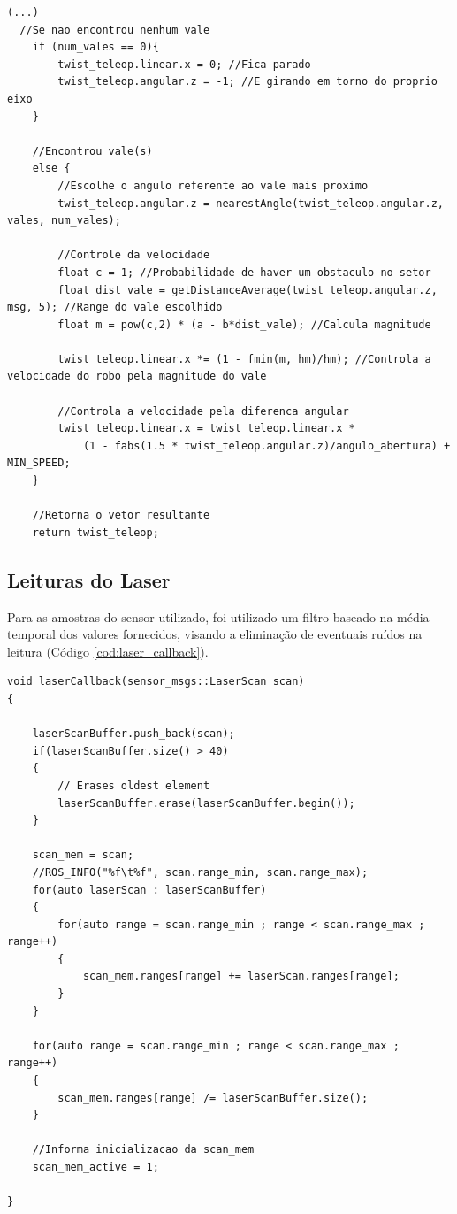 \begin{lstlisting}[frame=single, label=cod:vales, style=customc, caption={Escolha da direção e velocidade}]
(...)
  //Se nao encontrou nenhum vale
    if (num_vales == 0){
        twist_teleop.linear.x = 0; //Fica parado
        twist_teleop.angular.z = -1; //E girando em torno do proprio eixo
    }
    
    //Encontrou vale(s)
    else {
        //Escolhe o angulo referente ao vale mais proximo
        twist_teleop.angular.z = nearestAngle(twist_teleop.angular.z, vales, num_vales);
        
        //Controle da velocidade
        float c = 1; //Probabilidade de haver um obstaculo no setor
        float dist_vale = getDistanceAverage(twist_teleop.angular.z, msg, 5); //Range do vale escolhido
        float m = pow(c,2) * (a - b*dist_vale); //Calcula magnitude
        
        twist_teleop.linear.x *= (1 - fmin(m, hm)/hm); //Controla a velocidade do robo pela magnitude do vale
        
        //Controla a velocidade pela diferenca angular
        twist_teleop.linear.x = twist_teleop.linear.x *
            (1 - fabs(1.5 * twist_teleop.angular.z)/angulo_abertura) + MIN_SPEED;
    }
    
    //Retorna o vetor resultante
    return twist_teleop;

\end{lstlisting}

\subsection{Leituras do Laser}

Para as amostras do sensor utilizado, foi utilizado um filtro baseado
na média temporal dos valores fornecidos, visando a eliminação de
eventuais ruídos na leitura (Código \ref{cod:laser_callback}).

\begin{lstlisting}[frame=single, label=cod:laser_callback, style=customc, caption={Filtro de amostras do laser}]
void laserCallback(sensor_msgs::LaserScan scan)
{
    
    laserScanBuffer.push_back(scan);
    if(laserScanBuffer.size() > 40)
    {
        // Erases oldest element
        laserScanBuffer.erase(laserScanBuffer.begin());
    }
    
    scan_mem = scan;
    //ROS_INFO("%f\t%f", scan.range_min, scan.range_max);
    for(auto laserScan : laserScanBuffer)
    {
        for(auto range = scan.range_min ; range < scan.range_max ; range++)
        {
            scan_mem.ranges[range] += laserScan.ranges[range];
        }
    }
    
    for(auto range = scan.range_min ; range < scan.range_max ; range++)
    {
        scan_mem.ranges[range] /= laserScanBuffer.size();
    }
    
    //Informa inicializacao da scan_mem
    scan_mem_active = 1;
    
}
\end{lstlisting}
